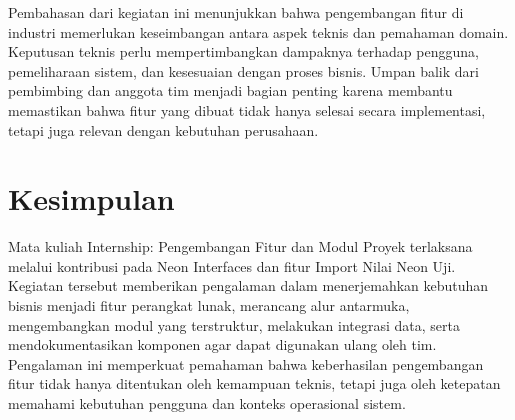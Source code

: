 Pembahasan dari kegiatan ini menunjukkan bahwa pengembangan fitur di industri memerlukan keseimbangan antara aspek teknis dan pemahaman domain. Keputusan teknis perlu mempertimbangkan dampaknya terhadap pengguna, pemeliharaan sistem, dan kesesuaian dengan proses bisnis. Umpan balik dari pembimbing dan anggota tim menjadi bagian penting karena membantu memastikan bahwa fitur yang dibuat tidak hanya selesai secara implementasi, tetapi juga relevan dengan kebutuhan perusahaan.

\section{Kesimpulan}
Mata kuliah Internship: Pengembangan Fitur dan Modul Proyek terlaksana melalui kontribusi pada Neon Interfaces dan fitur Import Nilai Neon Uji. Kegiatan tersebut memberikan pengalaman dalam menerjemahkan kebutuhan bisnis menjadi fitur perangkat lunak, merancang alur antarmuka, mengembangkan modul yang terstruktur, melakukan integrasi data, serta mendokumentasikan komponen agar dapat digunakan ulang oleh tim. Pengalaman ini memperkuat pemahaman bahwa keberhasilan pengembangan fitur tidak hanya ditentukan oleh kemampuan teknis, tetapi juga oleh ketepatan memahami kebutuhan pengguna dan konteks operasional sistem.
